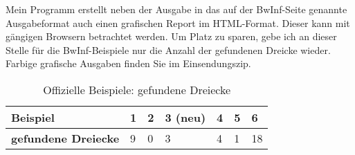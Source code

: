 Mein Programm erstellt neben der Ausgabe in das auf der BwInf-Seite genannte
Ausgabeformat auch einen grafischen Report im HTML-Format.
Dieser kann mit gängigen Browsern betrachtet werden.
Um Platz zu sparen, gebe ich an dieser Stelle für die BwInf-Beispiele nur die Anzahl
der gefundenen Dreicke wieder. Farbige grafische Ausgaben finden Sie im Einsendungszip.

\begin{table}[h]
    \centering
    \begin{tabular}{l|llllll}
        \textbf{Beispiel}           & 1 & 2 & 3 (neu) & 4 & 5 & 6 \\ \hline
        \textbf{gefundene Dreiecke} & 9 & 0 & 3       & 4 & 1 & 18
    \end{tabular}
    \caption{Offizielle Beispiele: gefundene Dreiecke}
    \label{tab:bwinfbeispiele}
\end{table}
